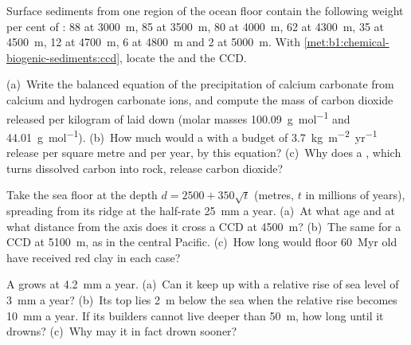 \begin{exercise}[$\star$]\label{exo:b1:chemical-biogenic-sediments:4}
Surface sediments from one region of the ocean floor contain the following
weight per cent of : 88 at \qty{3000}{m}, 85 at \qty{3500}{m}, 80 at
\qty{4000}{m}, 62 at \qty{4300}{m}, 35 at \qty{4500}{m}, 12 at \qty{4700}{m}, 6
at \qty{4800}{m} and 2 at \qty{5000}{m}. With
\cref{met:b1:chemical-biogenic-sediments:ccd}, locate the  and the CCD.
\end{exercise}

\begin{exercise}[$\star\star$]\label{exo:b1:chemical-biogenic-sediments:5}
(a)~Write the balanced equation of the precipitation of calcium carbonate from
calcium and hydrogen carbonate ions, and compute the mass of carbon dioxide
released per kilogram of  laid down (molar masses \qty{100.09}{g.mol^{-1}}
and \qty{44.01}{g.mol^{-1}}). (b)~How much would a  with a budget of
\qty{3.7}{kg.m^{-2}.yr^{-1}} release per square metre and per year, by this
equation? (c)~Why does a , which turns dissolved carbon into rock, release
carbon dioxide?
\end{exercise}

\begin{exercise}[$\star\star$]\label{exo:b1:chemical-biogenic-sediments:6}
Take the sea floor at the depth $d = 2500 + 350\sqrt t$ (metres, $t$ in
millions of years), spreading from its ridge at the half-rate \qty{25}{mm} a
year. (a)~At what age and at what distance from the axis does it cross a CCD at
\qty{4500}{m}? (b)~The same for a CCD at \qty{5100}{m}, as in the central
Pacific. (c)~How long would floor \qty{60}{Myr} old have received red clay in
each case?
\end{exercise}

\begin{exercise}[$\star\star$]\label{exo:b1:chemical-biogenic-sediments:7}
A  grows at \qty{4.2}{mm} a year. (a)~Can it keep up with a relative
rise of sea level of \qty{3}{mm} a year? (b)~Its top lies \qty{2}{m} below the
sea when the relative rise becomes \qty{10}{mm} a year. If its builders cannot
live deeper than \qty{50}{m}, how long until it drowns?
(c)~Why may it in fact drown sooner?
\end{exercise}

